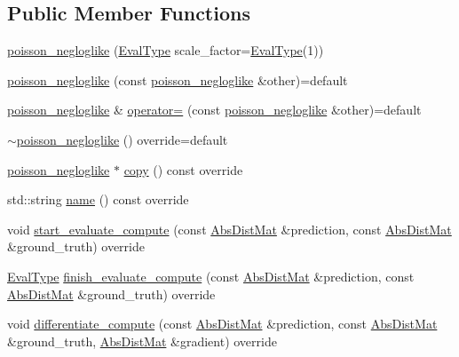 \subsection*{Public Member Functions}
\begin{DoxyCompactItemize}
\item 
\hyperlink{classlbann_1_1poisson__negloglike_af2eabe95046d8995263a2df9e8e34f7d}{poisson\+\_\+negloglike} (\hyperlink{base_8hpp_a3266f5ac18504bbadea983c109566867}{Eval\+Type} scale\+\_\+factor=\hyperlink{base_8hpp_a3266f5ac18504bbadea983c109566867}{Eval\+Type}(1))
\item 
\hyperlink{classlbann_1_1poisson__negloglike_a0d85fa77a2dc622524726584619e718a}{poisson\+\_\+negloglike} (const \hyperlink{classlbann_1_1poisson__negloglike}{poisson\+\_\+negloglike} \&other)=default
\item 
\hyperlink{classlbann_1_1poisson__negloglike}{poisson\+\_\+negloglike} \& \hyperlink{classlbann_1_1poisson__negloglike_a1a4e084da868ff7e353f842662dd5e9a}{operator=} (const \hyperlink{classlbann_1_1poisson__negloglike}{poisson\+\_\+negloglike} \&other)=default
\item 
\hyperlink{classlbann_1_1poisson__negloglike_abf677df47c894d197b2ac55d08ff109c}{$\sim$poisson\+\_\+negloglike} () override=default
\item 
\hyperlink{classlbann_1_1poisson__negloglike}{poisson\+\_\+negloglike} $\ast$ \hyperlink{classlbann_1_1poisson__negloglike_a0c24847ce45940d823e27b274fb8b5c4}{copy} () const override
\item 
std\+::string \hyperlink{classlbann_1_1poisson__negloglike_ae5a73d52075578a3d0ed0b150a980741}{name} () const override
\item 
void \hyperlink{classlbann_1_1poisson__negloglike_ad69c0a20f5015ee02eb0c20e87129ffa}{start\+\_\+evaluate\+\_\+compute} (const \hyperlink{base_8hpp_a9a697a504ae84010e7439ffec862b470}{Abs\+Dist\+Mat} \&prediction, const \hyperlink{base_8hpp_a9a697a504ae84010e7439ffec862b470}{Abs\+Dist\+Mat} \&ground\+\_\+truth) override
\item 
\hyperlink{base_8hpp_a3266f5ac18504bbadea983c109566867}{Eval\+Type} \hyperlink{classlbann_1_1poisson__negloglike_a67c3cb239905fa9ee57369dddbbe76ed}{finish\+\_\+evaluate\+\_\+compute} (const \hyperlink{base_8hpp_a9a697a504ae84010e7439ffec862b470}{Abs\+Dist\+Mat} \&prediction, const \hyperlink{base_8hpp_a9a697a504ae84010e7439ffec862b470}{Abs\+Dist\+Mat} \&ground\+\_\+truth) override
\item 
void \hyperlink{classlbann_1_1poisson__negloglike_a9b6e6632bb6424551b38b8748ff64edd}{differentiate\+\_\+compute} (const \hyperlink{base_8hpp_a9a697a504ae84010e7439ffec862b470}{Abs\+Dist\+Mat} \&prediction, const \hyperlink{base_8hpp_a9a697a504ae84010e7439ffec862b470}{Abs\+Dist\+Mat} \&ground\+\_\+truth, \hyperlink{base_8hpp_a9a697a504ae84010e7439ffec862b470}{Abs\+Dist\+Mat} \&gradient) override
\end{DoxyCompactItemize}
